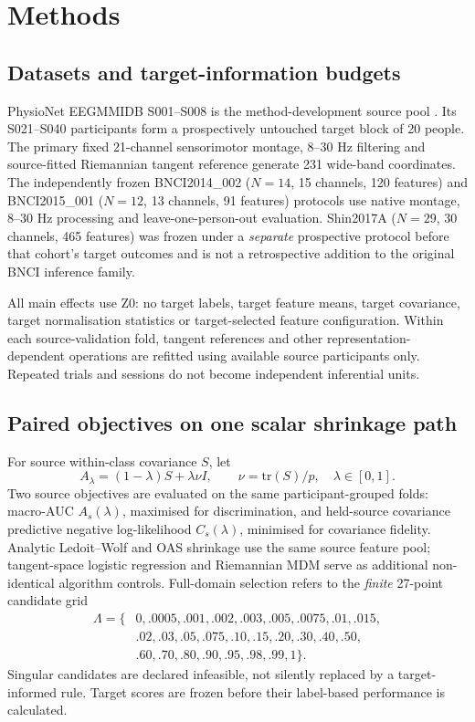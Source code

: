 \documentclass[11pt,a4paper]{article}
\begin{document}


\section{Methods}
\subsection{Datasets and target-information budgets}
PhysioNet EEGMMIDB S001--S008 is the method-development source pool
\cite{schalk2009eegmmidb,schalk2004bci2000}.
Its S021--S040 participants form a prospectively untouched target block
of 20 people. The primary fixed 21-channel sensorimotor montage, 8--30 Hz
filtering and source-fitted Riemannian tangent reference generate 231
wide-band coordinates. The independently frozen BNCI2014\_002
(\(N=14\), 15 channels, 120 features) and BNCI2015\_001
(\(N=12\), 13 channels, 91 features) protocols use native montage,
8--30 Hz processing and leave-one-person-out evaluation. Shin2017A
(\(N=29\), 30 channels, 465 features) was frozen under a \emph{separate}
prospective protocol before that cohort's target outcomes and is not a
retrospective addition to the original BNCI inference family.

All main effects use Z0: no target labels, target feature means, target
covariance, target normalisation statistics or target-selected feature
configuration. Within each source-validation fold, tangent references and
other representation-dependent operations are refitted using available
source participants only. Repeated trials and sessions do not become
independent inferential units.

\subsection{Paired objectives on one scalar shrinkage path}
For source within-class covariance \(S\), let
\[
 A_\lambda=(1-\lambda)S+\lambda\nu I,\qquad
 \nu=\mathrm{tr}(S)/p,\quad \lambda\in[0,1].
\]
Two source objectives are evaluated on the same participant-grouped folds:
macro-AUC \(A_s(\lambda)\), maximised for discrimination, and held-source
covariance predictive negative log-likelihood \(C_s(\lambda)\), minimised for
covariance fidelity. Analytic Ledoit--Wolf and OAS shrinkage use the same
source feature pool; tangent-space logistic regression and Riemannian
MDM serve as additional non-identical algorithm controls. Full-domain
selection refers to the \emph{finite} 27-point candidate grid
\[
\begin{aligned}
\Lambda=\{&0,.0005,.001,.002,.003,.005,.0075,.01,.015,\\
&.02,.03,.05,.075,.10,.15,.20,.30,.40,.50,\\
&.60,.70,.80,.90,.95,.98,.99,1\}.
\end{aligned}
\]
Singular candidates are declared infeasible, not silently replaced by
a target-informed rule. Target scores are frozen before their
label-based performance is calculated.
\end{document}
